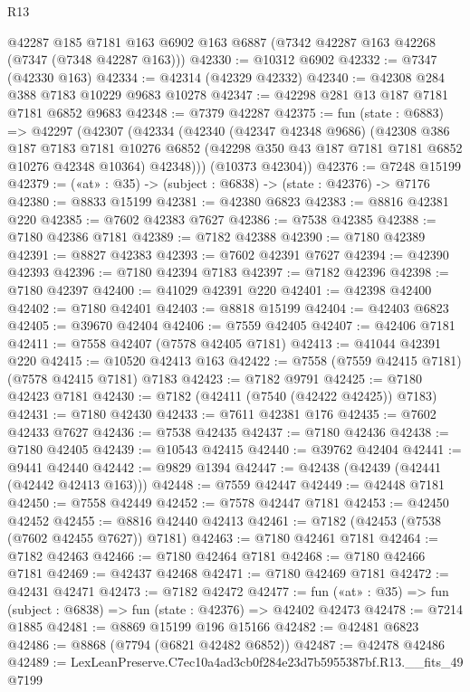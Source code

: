 \begin{lexlean}{R13}
\begin{coremodule}
    @42287
    @185
    @7181
    @163
    @6902
    @163
    @6887
    (@7342 @42287 @163 @42268 (@7347 (@7348 @42287 @163)))
@42330 := @10312 @6902
@42332 := @7347 (@42330 @163)
@42334 := @42314 (@42329 @42332)
@42340 := @42308 @284 @388 @7183 @10229 @9683 @10278
@42347 := @42298 @281 @13 @187 @7181 @7181 @6852 @9683
@42348 := @7379 @42287
@42375 := fun (state : @6883) =>
  @42297
    (@42307
      (@42334
        (@42340
          (@42347 @42348 @9686)
          (@42308
            @386
            @187
            @7183
            @7181
            @10276
            @6852
            (@42298 @350 @43 @187 @7181 @7181 @6852 @10276 @42348 @10364)
            @42348)))
      (@10373 @42304))
@42376 := @7248 @15199
@42379 := («at» : @35) -> (subject : @6838) -> (state : @42376) -> @7176
@42380 := @8833 @15199
@42381 := @42380 @6823
@42383 := @8816 @42381 @220
@42385 := @7602 @42383 @7627
@42386 := @7538 @42385
@42388 := @7180 @42386 @7181
@42389 := @7182 @42388
@42390 := @7180 @42389
@42391 := @8827 @42383
@42393 := @7602 @42391 @7627
@42394 := @42390 @42393
@42396 := @7180 @42394 @7183
@42397 := @7182 @42396
@42398 := @7180 @42397
@42400 := @41029 @42391 @220
@42401 := @42398 @42400
@42402 := @7180 @42401
@42403 := @8818 @15199
@42404 := @42403 @6823
@42405 := @39670 @42404
@42406 := @7559 @42405
@42407 := @42406 @7181
@42411 := @7558 @42407 (@7578 @42405 @7181)
@42413 := @41044 @42391 @220
@42415 := @10520 @42413 @163
@42422 := @7558 (@7559 @42415 @7181) (@7578 @42415 @7181) @7183
@42423 := @7182 @9791
@42425 := @7180 @42423 @7181
@42430 := @7182 (@42411 (@7540 (@42422 @42425)) @7183)
@42431 := @7180 @42430
@42433 := @7611 @42381 @176
@42435 := @7602 @42433 @7627
@42436 := @7538 @42435
@42437 := @7180 @42436
@42438 := @7180 @42405
@42439 := @10543 @42415
@42440 := @39762 @42404
@42441 := @9441 @42440
@42442 := @9829 @1394
@42447 := @42438 (@42439 (@42441 (@42442 @42413 @163)))
@42448 := @7559 @42447
@42449 := @42448 @7181
@42450 := @7558 @42449
@42452 := @7578 @42447 @7181
@42453 := @42450 @42452
@42455 := @8816 @42440 @42413
@42461 := @7182 (@42453 (@7538 (@7602 @42455 @7627)) @7181)
@42463 := @7180 @42461 @7181
@42464 := @7182 @42463
@42466 := @7180 @42464 @7181
@42468 := @7180 @42466 @7181
@42469 := @42437 @42468
@42471 := @7180 @42469 @7181
@42472 := @42431 @42471
@42473 := @7182 @42472
@42477 := fun («at» : @35) => fun (subject : @6838) => fun (state : @42376) => @42402 @42473
@42478 := @7214 @1885
@42481 := @8869 @15199 @196 @15166
@42482 := @42481 @6823
@42486 := @8868 (@7794 (@6821 @42482 @6852))
@42487 := @42478 @42486
@42489 := LexLeanPreserve.C7ec10a4ad3cb0f284e23d7b5955387bf.R13.__fits_49 @7199

\end{coremodule}
\end{lexlean}
